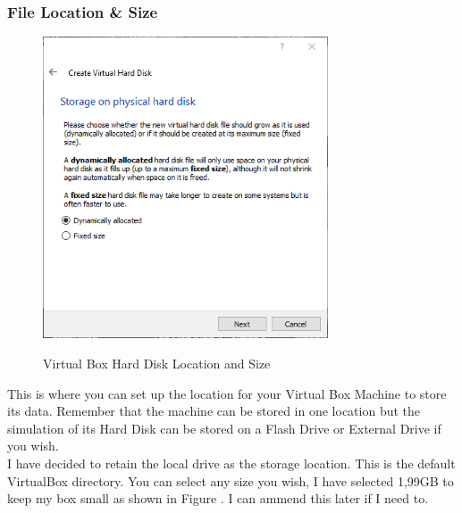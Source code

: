 \subsubsection{File Location \& Size}
\begin{figure}[!htb]
    \centering
    \includegraphics[width=0.752\textwidth]{images/Win00-05.png}\\[0cm]  
    \caption[Windows Virtual Box]{Virtual Box Hard Disk Location and Size}
    \label{fig:00-06 - Windows Virtual Box Hard Disk} 
\end{figure}
This is where you can set up the location for your Virtual Box Machine to
store its data. Remember that the machine can be stored in one location but
the simulation of its Hard Disk can be stored on a Flash Drive or External
Drive if you wish.\\

I have decided to retain the local drive as the storage location. This is 
the default VirtualBox directory. You can select any size you wish, I have
selected 1,99GB to keep my box small as shown in Figure .
I can ammend this later if I need to.


